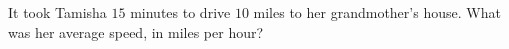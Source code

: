 It took Tamisha $15$ minutes to drive $10$ miles to her grandmother's house. What was her average speed, in miles per hour?
